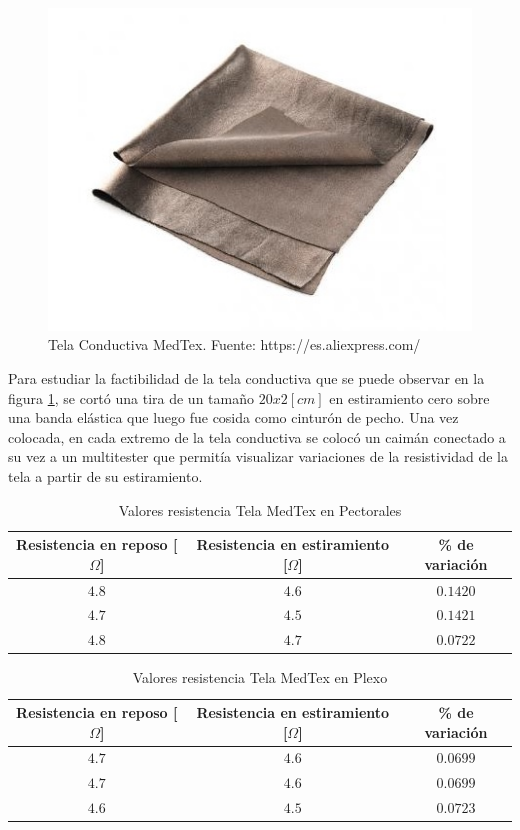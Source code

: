 \begin{figure}[H]
	\centering
	\includegraphics[scale=0.5]{figuras/tela/medtex.jpg}
	\caption{Tela Conductiva MedTex. Fuente: https://es.aliexpress.com/}
	\label{medtex}
\end{figure}

Para estudiar la factibilidad de la tela conductiva que se puede observar en la figura \ref{medtex}, se cortó una tira de un tamaño $20x2 [cm]$ en estiramiento cero sobre una banda elástica que luego fue cosida como cinturón de pecho. Una vez colocada, en cada extremo de la tela conductiva se colocó un caimán conectado a su vez a un multitester que permitía visualizar variaciones de la resistividad de la tela a partir de su estiramiento. 

\newpage
\begin{table}[H]
	\centering
	\begin{tabular}{| c | c | c |}
		\hline
		\multicolumn{1}{|c|}{\textbf{Resistencia en reposo [$\Omega$]}}&
		\multicolumn{1}{c|}{\textbf{Resistencia en estiramiento [$\Omega$]}}&
		\multicolumn{1}{|c|}{\textbf{\% de variación}}\\ \hline
		$4.8$  & $4.6$  & $0.1420$  \\ \hline
		$4.7$  & $4.5$ & $0.1421$ \\ \hline
		$4.8$ & $4.7$  & $0.0722$  \\ \hline
	\end{tabular}
	\caption{Valores resistencia Tela MedTex en Pectorales}
	\label{tablatex1}
\end{table}

\begin{table}[H]
	\centering
	\begin{tabular}{| c | c | c |}
		\hline
		\multicolumn{1}{|c|}{\textbf{Resistencia en reposo [$\Omega$]}}&
		\multicolumn{1}{c|}{\textbf{Resistencia en estiramiento [$\Omega$]}}&
		\multicolumn{1}{|c|}{\textbf{\% de variación}}\\ \hline
		$4.7$  & $4.6$  & $0.0699$  \\ \hline
		$4.7$  & $4.6$ & $0.0699$ \\ \hline
		$4.6$ & $4.5$  & $0.0723$  \\ \hline
	\end{tabular}
	\caption{Valores resistencia Tela MedTex en Plexo}
	\label{tablatex2}
\end{table}

